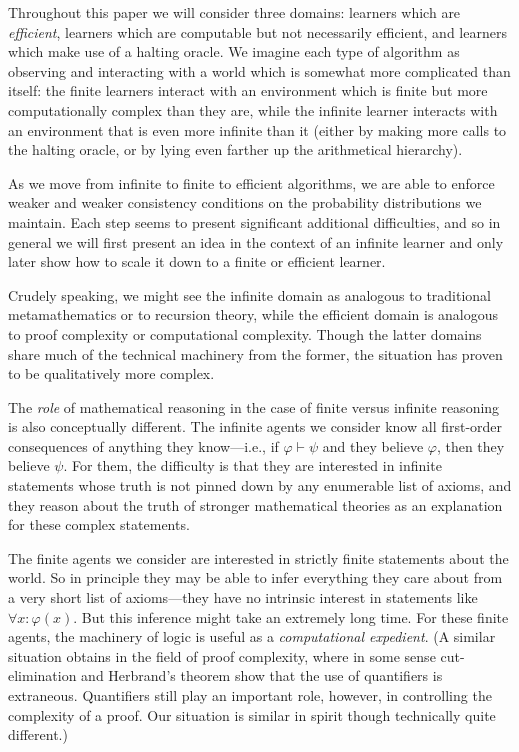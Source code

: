 \documentclass[12pt]{article}
\theoremstyle{definition}
\newcommand{\of}[1]{\left(#1\right)}
\newcommand{\vp}{\varphi}
\begin{document}
Throughout this paper we will consider three domains:
learners which are \emph{efficient}, learners which
are computable but not necessarily efficient,
and learners which make use of a halting oracle.
We imagine each type of algorithm as observing and interacting with a world
which is somewhat more complicated than itself:
the finite learners interact with an environment
which is finite but more computationally complex than they are,
while the infinite learner interacts with
an environment that is even more infinite than it (either by
making more calls to the halting oracle, or by
lying even farther up the arithmetical hierarchy).

As we move from infinite to finite to efficient algorithms,
we are able to enforce weaker and weaker consistency
conditions on the probability distributions we maintain.
Each step seems to present significant additional difficulties,
and so in general we will first present an idea in the context
of an infinite learner and only later show how to scale it down
to a finite or efficient learner.

Crudely speaking, we might see the infinite domain
as analogous to traditional metamathematics or to recursion theory,
while the efficient domain is analogous to proof complexity or 
computational complexity.
Though the latter domains share much of the technical machinery
from the former, the situation has proven to be qualitatively more complex.

The \emph{role} of mathematical reasoning in the case of finite
versus infinite reasoning is also conceptually different.
The infinite agents we consider know all first-order consequences
of anything they know---i.e., if $\vp \vdash \psi$ and they believe $\vp$,
then they believe $\psi$.
For them, the difficulty is that they are interested in infinite statements
whose truth is not pinned down by any enumerable list of axioms,
and they reason about the truth of stronger mathematical theories as an explanation
for these complex statements.

The finite agents we consider are interested in strictly finite statements
about the world.
So in principle they may be able to infer everything they care about
from a very short list of axioms---they have no intrinsic
interest in statements like $\forall x : \vp\of{x}$.
But this inference might take an extremely long time.
For these finite agents, the machinery of logic is useful as a
\emph{computational expedient}.
(A similar situation obtains in the field of proof complexity,
where in some sense cut-elimination and Herbrand's theorem
show that the use of quantifiers is extraneous.
Quantifiers still play an important role, however,
in controlling the complexity of a proof.
Our situation is similar in spirit though technically quite different.)
\end{document}
